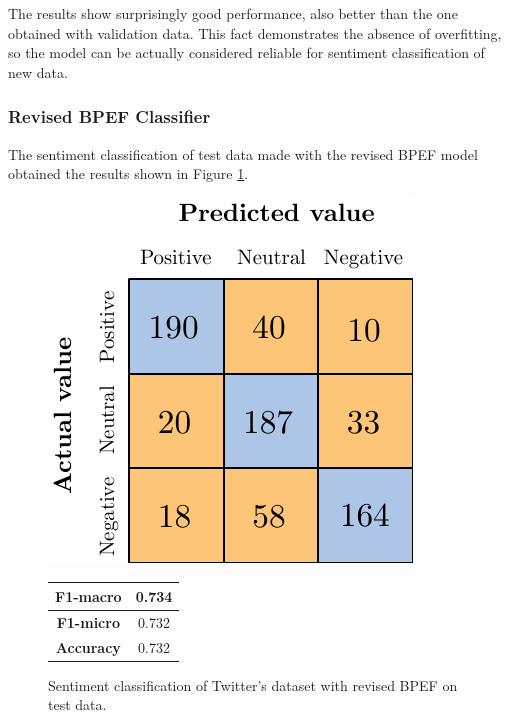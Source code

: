 The results show surprisingly good performance, also better than the one obtained with validation data. This fact demonstrates the absence of overfitting, so the model can be actually considered reliable for sentiment classification of new data.


\subsubsection{Revised BPEF Classifier}

The sentiment classification of test data made with the revised \ac{BPEF} model obtained the results shown in Figure \ref{fig:tw_snt_bpef_tst}.

\begin{figure}[H]
	\begin{minipage}[b]{0.6\linewidth}
		\centering
		\includegraphics[scale=1]{figures/conf_matrices/twitter_snt_bpef/twitter_snt_bpef_afs.pdf}
	\end{minipage}
	\begin{minipage}[b]{0.3\linewidth}
		\begin{tabular}[b]{ | c | c | } 
			\hline
			\textbf{F1-macro} & 0.734 \\
			\hline
			\textbf{F1-micro} & 0.732 \\ 
			\hline
			\textbf{Accuracy} & 0.732 \\ 
			\hline
		\end{tabular}
	\end{minipage}
	\caption{Sentiment classification of Twitter's dataset with revised BPEF on test data.}
	\label{fig:tw_snt_bpef_tst}
\end{figure}

